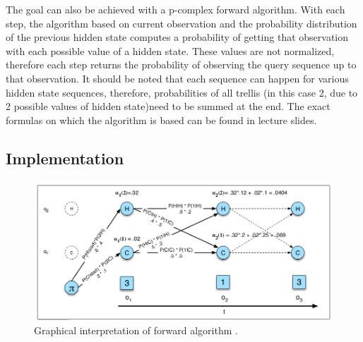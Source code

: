 \documentclass[10pt]{article}
\begin{document}
The goal can also be achieved with a p-complex forward algorithm\citep{bookA}. With each step, the algorithm based on current observation and the probability distribution of the previous hidden state computes a probability of getting that observation with each possible value of a hidden state. These values are not normalized, therefore each step returns the probability of observing the query sequence up to that observation. It should be noted that each sequence can happen for various hidden state sequences, therefore, probabilities of all trellis (in this case 2, due to 2 possible values of hidden state)need to be summed at the end. The exact formulas on which the algorithm is based can be found in lecture slides\citep{Lec7}.

\subsection{Implementation}
\begin{figure}[!h]
\caption{Graphical interpretation of forward algorithm \cite{bookA}.}
\includegraphics[width=\textwidth]{Trellis.jpg}
\end{figure}
\end{document}
